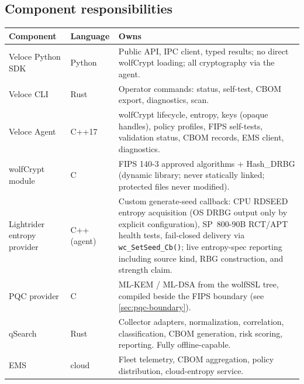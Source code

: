 \documentclass[10pt]{article}
\newcommand{\code}[1]{\texttt{\small #1}}
\begin{document}
\begin{center}
\end{center}

\subsection{Component responsibilities}
\begin{small}
\begin{tabularx}{\textwidth}{@{}llL@{}}
\toprule
\textbf{Component} & \textbf{Language} & \textbf{Owns} \\
\midrule
Veloce Python SDK & Python & Public API, IPC client, typed results; no direct wolfCrypt
  loading; all cryptography via the agent. \\
Veloce CLI & Rust & Operator commands: status, self-test, CBOM export, diagnostics, scan. \\
Veloce Agent & C++17 & wolfCrypt lifecycle, entropy, keys (opaque handles), policy
  profiles, FIPS self-tests, validation status, CBOM records, EMS client, diagnostics. \\
wolfCrypt module & C & FIPS 140-3 approved algorithms + Hash\_DRBG (dynamic library;
  never statically linked; protected files never modified). \\
Lightrider entropy provider & C++ (agent) & Custom generate-seed callback: CPU RDSEED
  entropy acquisition (OS DRBG output only by explicit configuration), SP~800-90B RCT/APT
  health tests, fail-closed delivery via \code{wc\_SetSeed\_Cb()}; live entropy-spec
  reporting including source kind, RBG construction, and strength claim. \\
PQC provider & C & ML-KEM / ML-DSA from the wolfSSL tree, compiled beside the FIPS
  boundary (see \ref{sec:pqc-boundary}). \\
qSearch & Rust & Collector adapters, normalization, correlation, classification, CBOM
  generation, risk scoring, reporting. Fully offline-capable. \\
EMS & cloud & Fleet telemetry, CBOM aggregation, policy distribution, cloud-entropy
  service. \\
\bottomrule
\end{tabularx}
\end{small}
\end{document}
